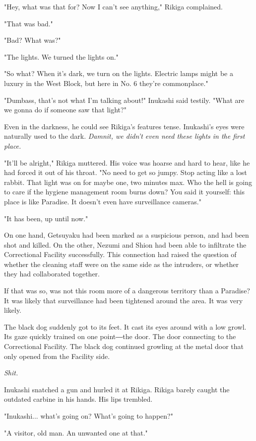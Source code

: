 "Hey, what was that for? Now I can't see anything," Rikiga complained.

"That was bad."

"Bad? What was?"

"The lights. We turned the lights on."

"So what? When it's dark, we turn on the lights. Electric lamps might be
a luxury in the West Block, but here in No. 6 they're commonplace."

"Dumbass, that's not what I'm talking about!" Inukashi said testily.
"What are we gonna do if someone saw that light?"

Even in the darkness, he could see Rikiga's features tense. Inukashi's
eyes were naturally used to the dark. \emph{Damnit, we didn't even need these
	lights in the first place.}

"It'll be alright," Rikiga muttered. His voice was hoarse and hard to
hear, like he had forced it out of his throat. "No need to get so jumpy.
Stop acting like a lost rabbit. That light was on for maybe one, two
minutes max. Who the hell is going to care if the hygiene management
room burns down? You said it yourself: this place is like Paradise. It
doesn't even have surveillance cameras."

"It has been, up until now."

On one hand, Getsuyaku had been marked as a suspicious person, and had
been shot and killed. On the other, Nezumi and Shion had been able to
infiltrate the Correctional Facility successfully. This connection had
raised the question of whether the cleaning staff were on the same side
as the intruders, or whether they had collaborated together.

If that was so, was not this room more of a dangerous territory than a
Paradise? It was likely that surveillance had been tightened around the
area. It was very likely.

The black dog suddenly got to its feet. It cast its eyes around with a
low growl. Its gaze quickly trained on one point―the door. The door
connecting to the Correctional Facility. The black dog continued
growling at the metal door that only opened from the Facility side.

\emph{Shit.}

Inukashi snatched a gun and hurled it at Rikiga. Rikiga barely caught
the outdated carbine in his hands. His lips trembled.

"Inukashi... what's going on? What's going to happen?"

"A visitor, old man. An unwanted one at that."

